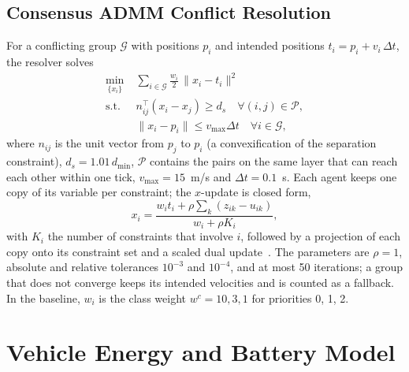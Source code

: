 \documentclass[journal]{IEEEtran}
\begin{document}
\subsection{Consensus ADMM Conflict Resolution}\label{sec:admm}
For a conflicting group $\mathcal{G}$ with positions $p_i$ and intended positions $t_i = p_i + v_i\,\Delta t$, the resolver solves
\begin{align}
\min_{\{x_i\}} \; & \sum_{i \in \mathcal{G}} \tfrac{w_i}{2}\,\|x_i - t_i\|^2 \label{eq:admm}\\
\text{s.t.}\; & n_{ij}^{\top}(x_i - x_j) \ge d_s \quad \forall (i,j) \in \mathcal{P}, \nonumber\\
& \|x_i - p_i\| \le v_{\max}\Delta t \quad \forall i \in \mathcal{G}, \nonumber
\end{align}
where $n_{ij}$ is the unit vector from $p_j$ to $p_i$ (a convexification of the separation constraint), $d_s = 1.01\,d_{\min}$, $\mathcal{P}$ contains the pairs on the same layer that can reach each other within one tick, $v_{\max} = 15$~m/s and $\Delta t = 0.1$~s. Each agent keeps one copy of its variable per constraint; the $x$-update is closed form,
\begin{equation}
x_i = \frac{w_i t_i + \rho \sum_{k}(z_{ik} - u_{ik})}{w_i + \rho K_i},
\label{eq:xupdate}
\end{equation}
with $K_i$ the number of constraints that involve $i$, followed by a projection of each copy onto its constraint set and a scaled dual update~\cite{boyd2011admm}. The parameters are $\rho = 1$, absolute and relative tolerances $10^{-3}$ and $10^{-4}$, and at most 50 iterations; a group that does not converge keeps its intended velocities and is counted as a fallback. In the baseline, $w_i$ is the class weight $w^{c} = 10, 3, 1$ for priorities 0, 1, 2.

\section{Vehicle Energy and Battery Model}\label{sec:battery}
\end{document}
